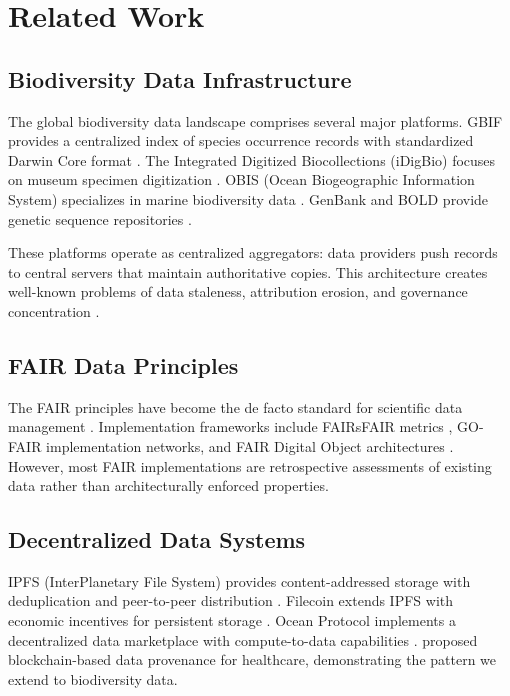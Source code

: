 \section{Related Work}

\label{sec:related}

\subsection{Biodiversity Data Infrastructure}

The global biodiversity data landscape comprises several major platforms.
GBIF provides a centralized index of species occurrence records with standardized Darwin Core format \citep{wieczorek2012darwin}.
The Integrated Digitized Biocollections (iDigBio) focuses on museum specimen digitization \citep{nelson2019digitization}.
OBIS (Ocean Biogeographic Information System) specializes in marine biodiversity data \citep{grassle2000ocean}.
GenBank and BOLD provide genetic sequence repositories \citep{benson2018genbank}.

These platforms operate as centralized aggregators: data providers push records to central servers that maintain authoritative copies.
This architecture creates well-known problems of data staleness, attribution erosion, and governance concentration \citep{arinoetal2013}.

\subsection{FAIR Data Principles}

The FAIR principles have become the de facto standard for scientific data management \citep{wilkinson2016fair}.
Implementation frameworks include FAIRsFAIR metrics \citep{devaraju2021fairsfair}, GO-FAIR implementation networks, and FAIR Digital Object architectures \citep{schultes2019fair}.
However, most FAIR implementations are retrospective assessments of existing data rather than architecturally enforced properties.

\subsection{Decentralized Data Systems}

IPFS (InterPlanetary File System) provides content-addressed storage with deduplication and peer-to-peer distribution \citep{benet2014ipfs}.
Filecoin extends IPFS with economic incentives for persistent storage \citep{protocol2017filecoin}.
Ocean Protocol implements a decentralized data marketplace with compute-to-data capabilities \citep{mcconaghy2020ocean}.
\citet{ramachandran2018trinity} proposed blockchain-based data provenance for healthcare, demonstrating the pattern we extend to biodiversity data.

